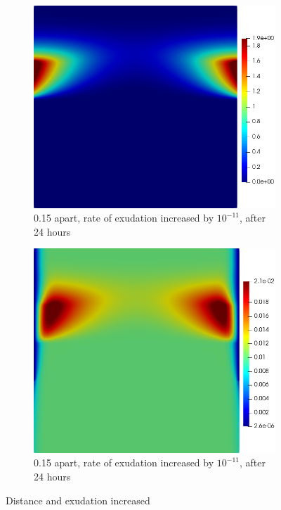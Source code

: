 \documentclass[11pt]{article}
\numberwithin{equation}{section}
\begin{document}
 \begin{figure}
     \centering
     \begin{subfigure}[t]{0.35\textwidth}
     \includegraphics[width=\textwidth]{Figures/testpics/IncreasedBufferAndDistancedDMA24.png}
     \caption{0.15 apart, rate of  exudation increased by $10^{-11}$,  after 24 hours}
     \end{subfigure}
     \hspace{1cm}
     \begin{subfigure}[t]{0.35\textwidth}
     \includegraphics[width=\textwidth]{Figures/testpics/IncreasedBufferAndDistanceZn24.png}
     \caption{0.15 apart, rate of  exudation increased by $10^{-11}$,  after 24 hours}
     \end{subfigure}
     \caption{Distance and  exudation increased}
 \end{figure}
\end{document}
